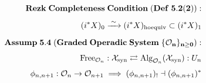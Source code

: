 \documentclass[preview]{standalone}
\begin{document}
\begin{align*}
\special{dvisvgm:raw <g id='unique000'>}\mathbf{Rezk\;Completeness\;Condition\;(Def\;5.2(2)):}\\[4pt](i^*X)_0 \xrightarrow{\;\sim\;} (i^*X)_{\text{hoequiv}} \subset (i^*X)_1\\[6pt]\mathbf{Assump\;5.4\;(Graded\;Operadic\;System\;\{\mathcal{O}_n\}_{n\ge 0}):}\\[4pt]\operatorname{Free}_{\mathcal{O}_n}: \mathcal{X}_{\text{syn}} \rightleftarrows \operatorname{Alg}_{\mathcal{O}_n}(\mathcal{X}_{\text{syn}}) : U_n\\[4pt]\phi_{n,n+1}: \mathcal{O}_n \to \mathcal{O}_{n+1} \implies (\phi_{n,n+1})_! \dashv (\phi_{n,n+1})^*\special{dvisvgm:raw </g>}
\end{align*}
\end{document}
